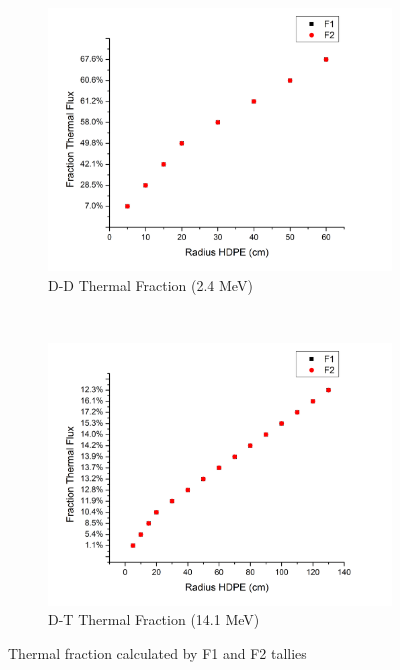 \documentclass[draftcls,onecolumn]{IEEEtran}
\begin{document}
\begin{figure}[ht]
	\centering
	\begin{subfigure}[b]{0.43\textwidth}
		\centering
		\includegraphics[width=\textwidth]{DDThermalFraction}
        \caption{D-D Thermal Fraction (2.4 MeV)}
	\end{subfigure}%
	~
	\begin{subfigure}[b]{0.43\textwidth}
		\centering
		\includegraphics[width=\textwidth]{DTThermalFraction}
        \caption{D-T Thermal Fraction (14.1 MeV)}
	\end{subfigure}	
	\caption{Thermal fraction calculated by F1 and F2 tallies}
	\label{fig:DDDTThermalFraction}
\end{figure}

\end{document}
